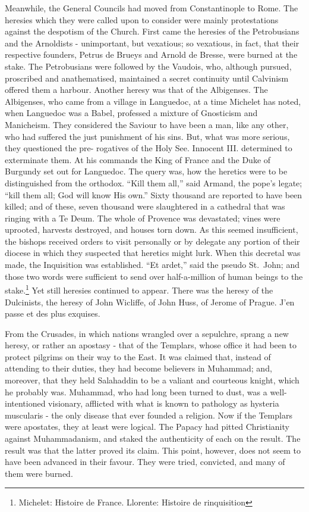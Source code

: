 \documentclass[]{book}
\let\rmarkdownfootnote\footnote%
\def\footnote{\protect\rmarkdownfootnote}
\begin{document}
Meanwhile, the General Councils had moved from Constantinople to Rome.
The heresies which they were called upon to consider were mainly
protestations against the despotism of the Church. First came the
heresies of the Petrobusians and the Arnoldists - unimportant, but
vexatious; so vexatious, in fact, that their respective founders, Petrus
de Brueys and Arnold de Bresse, were burned at the stake. The
Petrobusians were followed by the Vaudois, who, although pursued,
proscribed and anathematised, maintained a secret continuity until
Calvinism offered them a harbour. Another heresy was that of the
Albigenses. The Albigenses, who came from a village in Languedoc, at a
time Michelet has noted, when Languedoc was a Babel, professed a mixture
of Gnosticism and Manicheism. They considered the Saviour to have been a
man, like any other, who had suffered the just punishment of his sins.
But, what was more serious, they questioned the pre- rogatives of the
Holy See. Innocent III. determined to exterminate them. At his commands
the King of France and the Duke of Burgundy set out for Languedoc. The
query was, how the heretics were to be distinguished from the orthodox.
``Kill them all,'' said Armand, the pope's legate; ``kill them all; God
will know His own.'' Sixty thousand are reported to have been killed;
and of these, seven thousand were slaughtered in a cathedral that was
ringing with a Te Deum. The whole of Provence was devastated; vines were
uprooted, harvests destroyed, and houses torn down. As this seemed
insufficient, the bishops received orders to visit personally or by
delegate any portion of their diocese in which they suspected that
heretics might lurk. When this decretal was made, the Inquisition was
established. ``Et ardet,'' said the pseudo St.~John; and those two words
were sufficient to send over half-a-million of human beings to the
stake.\footnote{Michelet: Histoire de France. Llorente: Histoire de
  rinquisition} Yet still heresies continued to appear. There was the
heresy of the Dulcinists, the heresy of John Wicliffe, of John Huss, of
Jerome of Prague. J'en passe et des plus exquises.

From the Crusades, in which nations wrangled over a sepulchre, sprang a
new heresy, or rather an apostasy - that of the Templars, whose office
it had been to protect pilgrims on their way to the East. It was claimed
that, instead of attending to their duties, they had become believers in
Muhammad; and, moreover, that they held Salahaddin to be a valiant and
courteous knight, which he probably was. Muhammad, who had long been
turned to dust, was a well-intentioned visionary, afflicted with what is
known to pathology as hysteria muscularis - the only disease that ever
founded a religion. Now if the Templars were apostates, they at least
were logical. The Papacy had pitted Christianity against Muhammadanism,
and staked the authenticity of each on the result. The result was that
the latter proved its claim. This point, however, does not seem to have
been advanced in their favour. They were tried, convicted, and many of
them were burned.
\end{document}
